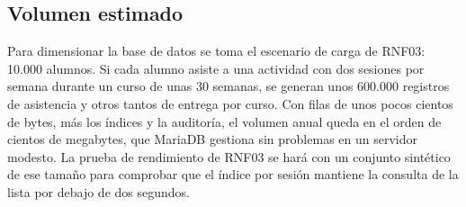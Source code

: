 \subsection{Volumen estimado}\label{sec:dis-volumen}

Para dimensionar la base de datos se toma el escenario de carga de RNF03: 10.000 alumnos. Si cada alumno asiste a una actividad con dos sesiones por semana durante un curso de unas 30 semanas, se generan unos 600.000 registros de asistencia y otros tantos de entrega por curso. Con filas de unos pocos cientos de bytes, más los índices y la auditoría, el volumen anual queda en el orden de cientos de megabytes, que MariaDB gestiona sin problemas en un servidor modesto. La prueba de rendimiento de RNF03 se hará con un conjunto sintético de ese tamaño para comprobar que el índice por sesión mantiene la consulta de la lista por debajo de dos segundos.
